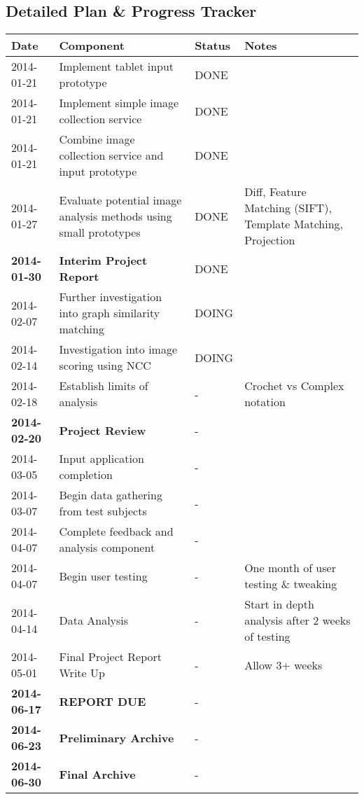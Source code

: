 \subsection{Detailed Plan \& Progress Tracker}

\begin{longtable}{|p{25mm}|p{61mm}|p{15mm}|p{50mm}|}
\hline
Date & Component & Status & Notes \\ \hline \hline

2014-01-21 & Implement tablet input prototype & DONE & \\ \hline
2014-01-21 & Implement simple image collection service & DONE & \\ \hline
2014-01-21 & Combine image collection service and input prototype & DONE & \\ \hline
2014-01-27 & Evaluate potential image analysis methods using small prototypes & DONE & Diff, Feature Matching (SIFT), Template Matching, Projection \\ \hline
\textbf{2014-01-30} & \textbf{Interim Project Report} & DONE & \\ \hline
2014-02-07 & Further investigation into graph similarity matching & DOING & \\ \hline
2014-02-14 & Investigation into image scoring using NCC & DOING & \\ \hline
2014-02-18 & Establish limits of analysis & - & Crochet vs Complex notation\\ \hline
\textbf{2014-02-20} & \textbf{Project Review} & - & \\ \hline
2014-03-05 & Input application completion & - & \\ \hline
2014-03-07 & Begin data gathering from test subjects & - & \\ \hline
2014-04-07 & Complete feedback and analysis component & - & \\ \hline
2014-04-07 & Begin user testing & - & One month of user testing \& tweaking \\ \hline
2014-04-14 & Data Analysis & - & Start in depth analysis after 2 weeks of testing \\ \hline
2014-05-01 & Final Project Report Write Up & - & Allow 3+ weeks \\ \hline
\textbf{2014-06-17} & \textbf{REPORT DUE} & - & \\ \hline
\textbf{2014-06-23} & \textbf{Preliminary Archive} & - & \\ \hline
\textbf{2014-06-30} & \textbf{Final Archive} & - & \\ \hline

\end{longtable}

